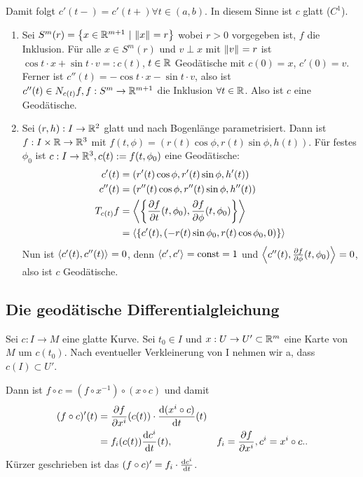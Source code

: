 \documentclass{skript}
\begin{document}
Damit folgt $c'(t-) = c'(t+) \forall t\in(a,b)$. In diesem Sinne ist $c$ glatt
($C^1$).
\begin{bsps}
  \begin{enumerate}
    \item Sei $S^m(r) = \mdef[x\in\R^{m+1}]{\norm{x} = r}$ wobei $r > 0$
      vorgegeben ist, $f$ die Inklusion. Für alle $x\in S^m(r)$ und $v\perp x$
      mit $\norm{v} = r$ ist $\cos t \cdot x + \sin t \cdot v =: c(t)$, $t\in
      \mathbb{R}$ Geodätische mit $c(0) = x$, $c'(0) = v$. Ferner ist $c''(t) = -\cos
      t\cdot x - \sin t \cdot v$, also ist $c''(t)\in N_{c(t)}f,
      f:S^m\to\mathbb{R}^{m+1}$ die Inklusion $\forall t\in\mathbb{R}$. Also ist $c$ eine
      Geodätische.
    \item Sei $(r,h):I\to\mathbb{R}^2$ glatt und nach Bogenlänge parametrisiert. Dann
      ist $f:I\times\mathbb{R}\to\mathbb{R}^3$ mit $f(t,\phi)= (r(t)\cos\phi, r(t)\sin\phi,
      h(t))$. Für festes $\phi_0$ ist $c:I\to\mathbb{R}^3, c(t) := f(t,\phi_0)$ eine
      Geodätische:
      \begin{align*}
        c'(t) &= (r'(t)\cos\phi,r'(t)\sin\phi,h'(t)) \\
        c''(t) &= (r''(t)\cos\phi,r''(t)\sin\phi,h''(t)) \\
        T_{c(t)}f &= \sprod{\mdef{\frac{\partial f}{\partial t}(t,\phi_0),
        \frac{\partial f}{\partial \phi}(t,\phi_0)}} \\
        &= \sprod{\mdef{c'(t), (-r(t)\sin\phi_0, r(t)\cos\phi_0, 0)}}
      \end{align*}
      Nun ist $\sprod{c'(t), c''(t)} = 0$, denn $\sprod{c',c'} = \mathrm{const}
      = 1$ und $\sprod{c''(t),\frac{\partial f}{\partial\phi}(t,\phi_0)} = 0$,
      also ist $c$ Geodätische.
  \end{enumerate}
\end{bsps}

\subsection{Die geodätische Differentialgleichung}

Sei $c: I\to M$ eine glatte Kurve. Sei $t_0\in I $ und $x:U\to U'\subset \mathbb{R}^m$
eine Karte von $M$ um $c(t_0)$. Nach eventueller Verkleinerung von I nehmen wir
a, dass $c(I) \subset U'$.

Dann ist $f\circ c = (f\circ x^{-1})\circ(x\circ c)$ und damit
\begin{align*}
  (f\circ c)'(t) &= \frac{\partial f}{\partial x^i}(c(t))\cdot
  \frac{\mathrm d(x^i\circ c)}{\mathrm d t}(t) \\
  &= f_i(c(t))\frac{\mathrm d c^i}{\mathrm d t}(t), & f_i = \frac{\partial f}{\partial x^i},
  c^i = x^i\circ c..
\end{align*}
Kürzer geschrieben ist das $(f\circ c)' = f_i\cdot\frac{\mathrm d c^i}{\mathrm d t}$.
\end{document}

